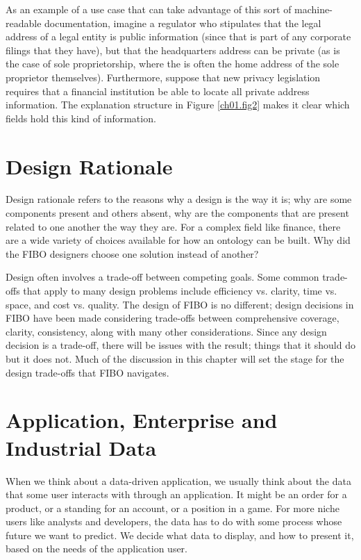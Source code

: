 As an example of a use case that can take advantage of this sort of machine-readable documentation, imagine a regulator who stipulates that the legal address of a legal entity is public information (since that is part of any corporate filings that they have), but that the headquarters address can be private (as is the case of sole proprietorship, where the  is often the home address of the sole proprietor themselves).  Furthermore, suppose that new privacy legislation requires that a financial institution be able to locate all private address information.   The explanation structure in Figure \ref{ch01.fig2} makes it clear which fields hold this kind of information. 

\section{Design Rationale}

Design rationale refers to the reasons why a design is the way it is; why are some components present and others absent, why are the components that are present related to one another the way they are.  For a complex field like finance, there are a wide variety of choices available for how an ontology can be built.  Why did the FIBO designers choose one solution instead of another? 

Design often involves a trade-off between competing goals.  Some common trade-offs that apply to many design problems include efficiency vs. clarity, time vs. space, and cost vs. quality.  The design of FIBO is no different; design decisions in FIBO have been made considering trade-offs between comprehensive coverage, clarity, consistency, along with many other considerations.   Since any design decision is a trade-off, there will be issues with the result; things that it should do but it does not.  Much of the discussion in this chapter will set the stage for the design trade-offs that FIBO navigates.


\section{Application, Enterprise and Industrial Data}
\label{ch01.sec1}

When we think about a data-driven application, we usually think about the data that some user interacts with through an application.  It might be an order for a product, or a standing for an account, or a position in a game.  For more niche users like analysts and developers, the data has to do with some process whose future we want to predict.  We decide what data to display, and how to present it, based on the needs of the application user. 

